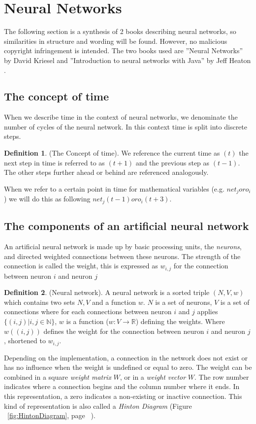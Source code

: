 \documentclass[pdftex,a4paper,12pt,twoside]{report}
\theoremstyle{plain} \newtheorem{theorem}{Theorem} \newtheorem{proposition}{Proposition} \newtheorem{lemma}{Lemma} \newtheorem*{corollary}{Corollary}
\theoremstyle{definition} \newtheorem{definition}{Definition} \newtheorem{conjecture}{Conjecture} \newtheorem*{example}{Example} \newtheorem{algorithm}{Algorithm}
\theoremstyle{remark} \newtheorem*{remark}{Remark} \newtheorem*{note}{Note} \newtheorem{case}{Case}
\begin{document}
\section{Neural Networks}
\label{sec:neuralnetworks}
The following section is a synthesis of 2 books describing neural networks, so similarities in structure and wording will be found. However, no malicious copyright infringement is intended. The two books used are ''Neural Networks'' by David Kriesel \citep{Kriesel2013} and ''Introduction to neural networks with Java'' by Jeff Heaton \citep{Heaton2005}.
\subsection{The concept of time}
When we describe time in the context of neural networks, we denominate the number of cycles of the neural network. In this context time is split into discrete steps.
\begin{definition}(The Concept of time). We reference the current time as $(t)$ the next step in time is referred to as $(t+1)$ and the previous step as $(t-1)$. The other steps further ahead or behind are referenced analogously. \end{definition} When we refer to a certain point in time for mathematical variables (e.g. $net_j or o_i$) we will do this as following $net_j(t-1) or o_i(t+3)$.
\subsection{The components of an artificial neural network}
An artificial neural network is made up by basic processing units, the \emph{neurons}, and directed weighted connections between these neurons. The strength of the connection is called the weight, this is expressed as $w_{i,j}$ for the connection between neuron $i$ and neuron $j$
\begin{definition}
(Neural network). A neural network is a sorted triple $(N, V, w)$ which contains two sets $N, V$ and a function $w$. $N$ is a set of neurons, $V$ is a set of connections where for each connections between neuron $i$ and $j$ applies $\{(i,j)|i,j \in  \mathbb{N}\}$, $w$ is a function ($w : V \to \mathbb{R}$) defining the weights. Where $w((i,j))$ defines the weight for the connection between neuron $i$ and neuron $j$, shortened to $w_{i,j}$.
\end{definition} Depending on the implementation, a connection in the network does not exist or has no influence when the weight is undefined or equal to zero. The weight can be combined in a square \emph{weight matrix} $W$, or in a \emph{weight vector} $W$. The row number indicates where a connection begins and the column number where it ends. In this representation, a zero indicates a non-existing or inactive connection. This kind of representation is also called a \emph{Hinton Diagram} (Figure ~\ref{fig:HintonDiagram}, page ~\pageref{fig:HintonDiagram}).
\end{document}
